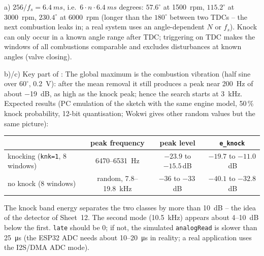 \begin{solution}
a) $256/f_s=\SI{6.4}{ms}$, i.e.\ $6\cdot n\cdot\SI{6.4}{ms}$ degrees:
$57.6^\circ$ at \SI{1500}{rpm}, $115.2^\circ$ at \SI{3000}{rpm}, $230.4^\circ$ at
\SI{6000}{rpm} (longer than the $180^\circ$ between two TDCs -- the next
combustion leaks in; a real system uses an angle-dependent $N$ or $f_s$).
Knock can only occur in a known angle range after TDC; triggering on TDC
makes the windows of all combustions comparable and excludes disturbances at
known angles (valve closing).

b)/c) Key part of :
The global maximum is the combustion vibration (half sine over $60^\circ$,
\SI{0.2}{V}): after the mean removal it still produces a peak near \SI{200}{Hz} of
about \SI{-19}{dB}, as high as the knock peak; hence the search starts at
\SI{3}{kHz}. Expected results (PC emulation of the sketch with the same engine
model, 50\,\% knock probability, 12-bit quantisation; Wokwi gives other random
values but the same picture):
\begin{center}\small
\begin{tabular}{lccc}
\toprule
 & peak frequency & peak level & \texttt{e\_knock}\\
\midrule
knocking (\texttt{knk=1}, 8 windows) & \SI{6470}{}--\SI{6531}{Hz} & $-23.9$ to $-15.5$\,dB & $-19.7$ to $-11.0$\,dB\\
no knock (8 windows) & random, 7.8--\SI{19.8}{kHz} & $-36$ to $-33$\,dB & $-40.1$ to $-32.8$\,dB\\
\bottomrule
\end{tabular}
\end{center}
The knock band energy separates the two classes by more than \SI{10}{dB} -- the
idea of the detector of Sheet~12. The second mode (\SI{10.5}{kHz}) appears
about \SI{4}{}--\SI{10}{dB} below the first. \texttt{late} should be 0; if not, the
simulated \texttt{analogRead} is slower than \SI{25}{\micro s} (the ESP32 ADC
needs about \SI{10}{}--\SI{20}{\micro s} in reality; a real application uses the
I2S/DMA ADC mode).


\end{solution}
